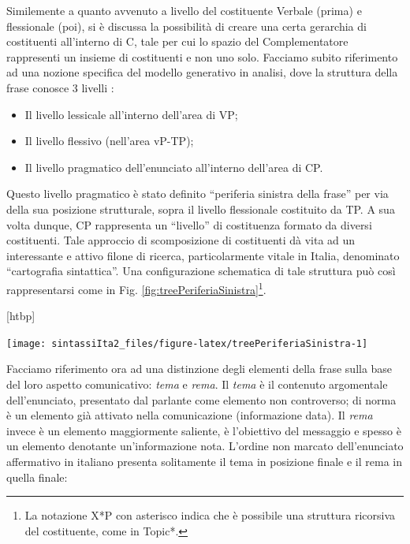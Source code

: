 \documentclass[
  a4paper,
  twoside,
  11pt,
  chapterprefix=false,
  bibliography=totocnumbered,
  listof=flat]{scrbook}
\makeatletter
\providecommand{\tightlist}{%
  \setlength{\itemsep}{0pt}\setlength{\parskip}{0pt}}
\def\fps@figure{htbp}
\renewenvironment{figure}[1][\fps@figure]{
  \edef\@tempa{\noexpand\@float{figure}[#1]} 
  \@tempa
  \sffamily
}{
  \end@float
}
\makeatother
\begin{document}
Similemente a quanto avvenuto a livello del costituente Verbale (prima) e flessionale (poi), si è discussa la possibilità di creare una certa gerarchia di costituenti all'interno di C, tale per cui lo spazio del Complementatore rappresenti un insieme di costituenti e non uno solo.
Facciamo subito riferimento ad una nozione specifica del modello generativo in analisi, dove la struttura della frase conosce 3 livelli \citep{rizzi1997}:

\begin{itemize}
\tightlist
\item
  Il livello lessicale all'interno dell'area di VP;
\item
  Il livello flessivo (nell'area vP-TP);
\item
  Il livello pragmatico dell'enunciato all'interno dell'area di CP.
\end{itemize}

Questo livello pragmatico è stato definito \enquote{periferia sinistra della frase} per via della sua posizione strutturale, sopra il livello flessionale costituito da TP.
A sua volta dunque, CP rappresenta un \enquote{livello} di costituenza formato da diversi costituenti. Tale approccio di scomposizione di costituenti dà vita ad un interessante e attivo filone di ricerca, particolarmente vitale in Italia, denominato \enquote{cartografia sintattica}. Una configurazione schematica di tale struttura può così rappresentarsi come in Fig. \ref{fig:treePeriferiaSinistra}\footnote{La notazione X*P con asterisco indica che è possibile una struttura ricorsiva del costituente, come in Topic*.}.

\begin{figure}

{\centering \texttt{[image: sintassiIta2\_files/figure-latex/treePeriferiaSinistra-1]} 

}

\caption{Struttura della periferia sinistra della frase}\label{fig:treePeriferiaSinistra}
\end{figure}

Facciamo riferimento ora ad una distinzione degli elementi della frase sulla base del loro aspetto comunicativo: \emph{tema} e \emph{rema}.
Il \emph{tema} è il contenuto argomentale dell'enunciato, presentato dal parlante come elemento non controverso; di norma è un elemento già attivato nella comunicazione (informazione data).
Il \emph{rema} invece è un elemento maggiormente saliente, è l'obiettivo del messaggio e spesso è un elemento denotante un'informazione nota.
L'ordine non marcato dell'enunciato affermativo in italiano presenta solitamente il tema in posizione finale e il rema in quella finale:
\end{document}
